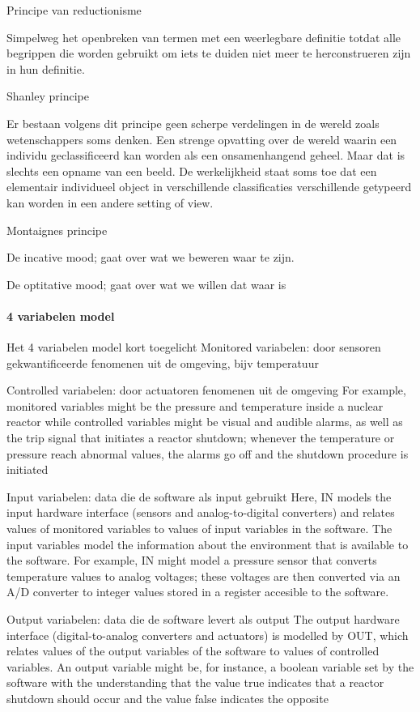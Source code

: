 Principe van reductionisme 

Simpelweg het openbreken van termen met een weerlegbare definitie totdat alle begrippen die worden gebruikt om iets te duiden  niet meer te herconstrueren zijn in hun definitie. 

Shanley principe 

Er bestaan volgens dit principe geen scherpe verdelingen in de wereld zoals wetenschappers soms denken. Een strenge opvatting over de wereld waarin een individu geclassificeerd kan worden als een onsamenhangend geheel. Maar dat is slechts een opname van een beeld. De werkelijkheid staat soms toe dat een elementair individueel object in verschillende classificaties verschillende getypeerd kan worden in een andere setting of view. 

Montaignes principe 

De incative mood; gaat over wat we beweren waar te zijn. 

De optitative mood; gaat over wat we willen dat waar is 
\paragraph{4 variabelen model}





Het 4 variabelen model kort toegelicht
Monitored variabelen: door sensoren gekwantificeerde fenomenen uit de omgeving, bijv temperatuur

Controlled variabelen: door actuatoren \bestuurde fenomenen uit de omgeving
For example, monitored variables might be the pressure and temperature
inside a nuclear reactor while controlled variables might be visual and audible alarms, as well
as the trip signal that initiates a reactor shutdown; whenever the temperature or pressure reach
abnormal values, the alarms go off and the shutdown procedure is initiated

Input variabelen: data die de software als input gebruikt
Here, IN models the input hardware interface (sensors and analog-to-digital converters) and
relates values of monitored variables to values of input variables in the software. The input variables model the information about the environment that is available to the software. For example,
IN might model a pressure sensor that converts temperature values to analog voltages; these voltages are then converted via an A/D converter to integer values stored in a register accesible to the
software.

Output variabelen: data die de software levert als output
The output hardware interface (digital-to-analog converters and actuators) is modelled
by OUT, which relates values of the output variables of the software to values of controlled variables. An output variable might be, for instance, a boolean variable set by the software with the
understanding that the value true indicates that a reactor shutdown should occur and the value
false indicates the opposite



